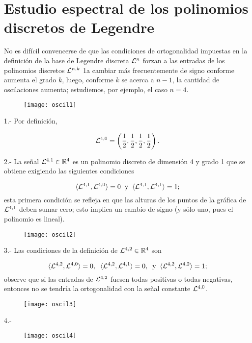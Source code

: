 \chapter{Estudio espectral de los polinomios discretos de Legendre}

No es difícil convencerse de que las condiciones de ortogonalidad
impuestas en la definición de la base de Legendre discreta
$\mathcal{L}^{n}$
forzan a las entradas de los polinomios discretos $\mathcal{L}^{n,k}$
1a cambiar más frecuentemente de signo conforme aumenta
el grado $k$, luego, conforme $k$ se acerca a $n-1$,
la cantidad de oscilaciones aumenta; estudiemos, 
por ejemplo, el caso $n=4$.

\begin{minipage}{0.5\textwidth}
\begin{figure}[H]
\texttt{[image: oscil1]}
\end{figure}
\end{minipage} \hfill
\begin{minipage}{0.45\textwidth}

1.- Por definición,

\[
\mathcal{L}^{4,0} = \left(
\frac{1}{2}, \frac{1}{2}, \frac{1}{2}, \frac{1}{2}
\right).
\]
\end{minipage}


\begin{minipage}{0.5\textwidth}
2.- La señal $\mathcal{L}^{4,1} \in \mathbb{R}^{4}$ es un polinomio discreto de
dimensión 4 y grado 1 que se obtiene exigiendo las
siguientes condiciones

\[
\langle \mathcal{L}^{4,1} , \mathcal{L}^{4,0} \rangle=0
\hspace{0.2cm} \text{y} \hspace{0.2cm}
\langle \mathcal{L}^{4,1} , \mathcal{L}^{4,1} \rangle=1;
\]
esta primera condición se refleja en que 
las alturas de los puntos de la gráfica de 
$\mathcal{L}^{4,1}$ deben sumar cero;
esto implica un cambio de signo (y sólo uno,
pues el polinomio es lineal).

\end{minipage} \hfill
\begin{minipage}{0.45\textwidth}
\begin{figure}[H]
\texttt{[image: oscil2]}
\end{figure}
\end{minipage}

3.- Las condiciones de la definición
de $\mathcal{L}^{4,2} \in \mathbb{R}^{4}$ son

\[
\langle \mathcal{L}^{4,2} , \mathcal{L}^{4,0} \rangle=0,
\hspace{0.2cm}
\langle \mathcal{L}^{4,2} , \mathcal{L}^{4,1} \rangle=0,
\hspace{0.2cm} \text{y} \hspace{0.2cm}
\langle \mathcal{L}^{4,2} , \mathcal{L}^{4,2} \rangle=1;
\]
observe que si las entradas de 
$\mathcal{L}^{4,2}$ fuesen todas positivas o todas negativas,
entonces no se tendría la ortogonalidad
con la señal constante $\mathcal{L}^{4,0}$. 


\begin{figure}[H]
\texttt{[image: oscil3]}
\end{figure}

4.- 
\begin{figure}[H]
\texttt{[image: oscil4]}
\end{figure}